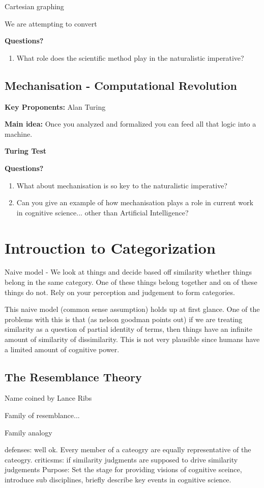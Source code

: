 \documentclass[twoside]{article}
\begin{document}
Cartesian graphing

We are attempting to convert

\textbf{Questions?}
\begin{enumerate}
  \item What role does the scientific method play in the naturalistic imperative?
\end{enumerate}


\subsection{Mechanisation - Computational Revolution}

\textbf{Key Proponents: } Alan Turing

\textbf{Main idea:} Once you analyzed and formalized you can feed all that logic
into a machine.

\textbf{Turing Test}

\textbf{Questions?}
\begin{enumerate}
  \item What about mechanisation is so key to the naturalistic imperative?
  \item Can you give an example of how mechanisation plays a role in current work
        in cognitive science... other than Artificial Intelligence?
\end{enumerate}

\section{Introuction to Categorization}
Naive model - We look at things and decide based off similarity whether
things belong in the same category. One of these things belong together
and on of these things do not. Rely on your perception and judgement to
form categories.

This naive model (common sense assumption) holds up at first glance. One of the
problems with this is that (as nelson goodman points out) if we are treating
similarity as a question of partial identity of terms, then things have an
infinite amount of similarity of dissimilarity. This is not very plausible
since humans have a limited amount of cognitive power.

\subsection{The Resemblance Theory}
Name coined by Lance Ribs

Family of resemblance...

Family analogy

defenses:
well ok. Every member of a cateogry are equally representative of the cateogry.
criticsms:
if similarity judgments are supposed to drive similarity judgements
Purpose: Set the stage for providing visions of cognitive sceince, introduce
sub disciplines, briefly describe key events in cognitive science.
\end{document}
